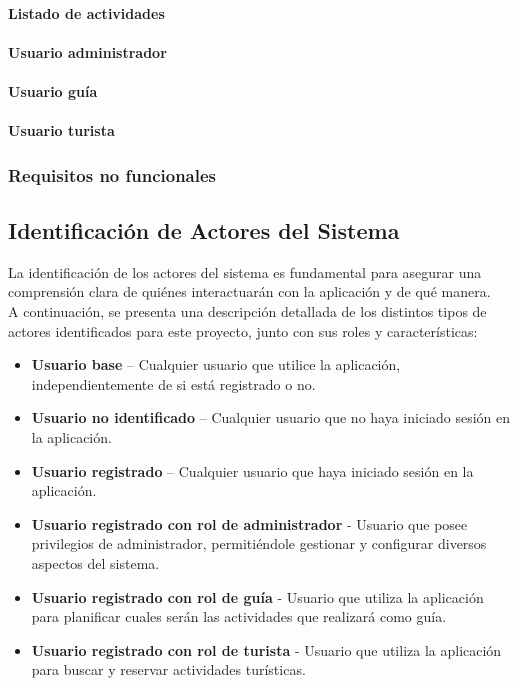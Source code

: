 \paragraph{Listado de actividades}

\paragraph{Usuario administrador}

\paragraph{Usuario guía}

\paragraph{Usuario turista}

\subsubsection{Requisitos no funcionales}

\subsection{Identificación de Actores del Sistema}
La identificación de los actores del sistema es fundamental para asegurar una comprensión clara de quiénes interactuarán con la aplicación y de qué manera.
\\[1ex]
A continuación, se presenta una descripción detallada de los distintos tipos de actores identificados para este proyecto, junto con sus roles y características:
\begin{itemize}
	\item \textbf{Usuario base} – Cualquier usuario que utilice la aplicación, independientemente de si está registrado o no.
	\item \textbf{Usuario no identificado} – Cualquier usuario que no haya iniciado sesión en la aplicación.
	\item \textbf{Usuario registrado} – Cualquier usuario que haya iniciado sesión en la aplicación.
	\item \textbf{Usuario registrado con rol de administrador} - Usuario que posee privilegios de administrador, permitiéndole gestionar y configurar diversos aspectos del sistema.
	\item \textbf{Usuario registrado con rol de guía} - Usuario que utiliza la aplicación para planificar cuales serán las actividades que realizará como guía.
	\item \textbf{Usuario registrado con rol de turista} - Usuario que utiliza la aplicación para buscar y reservar actividades turísticas.
\end{itemize}
